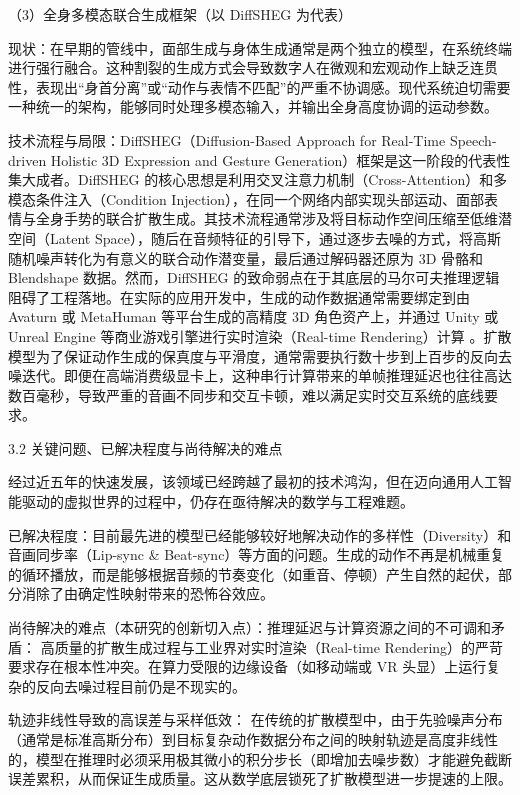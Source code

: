\documentclass[UTF8]{ctexart}
\begin{document}
（3）全身多模态联合生成框架（以 DiffSHEG 为代表）

现状：在早期的管线中，面部生成与身体生成通常是两个独立的模型，在系统终端进行强行融合。这种割裂的生成方式会导致数字人在微观和宏观动作上缺乏连贯性，表现出``身首分离''或``动作与表情不匹配''的严重不协调感。现代系统迫切需要一种统一的架构，能够同时处理多模态输入，并输出全身高度协调的运动参数。

技术流程与局限：DiffSHEG（Diffusion-Based Approach for Real-Time
Speech-driven Holistic 3D Expression and Gesture
Generation）框架是这一阶段的代表性集大成者。DiffSHEG
的核心思想是利用交叉注意力机制（Cross-Attention）和多模态条件注入（Condition
Injection），在同一个网络内部实现头部运动、面部表情与全身手势的联合扩散生成。其技术流程通常涉及将目标动作空间压缩至低维潜空间（Latent
Space），随后在音频特征的引导下，通过逐步去噪的方式，将高斯随机噪声转化为有意义的联合动作潜变量，最后通过解码器还原为
3D 骨骼和 Blendshape 数据。然而，DiffSHEG
的致命弱点在于其底层的马尔可夫推理逻辑阻碍了工程落地。在实际的应用开发中，生成的动作数据通常需要绑定到由
Avaturn 或 MetaHuman 等平台生成的高精度 3D 角色资产上，并通过 Unity 或
Unreal Engine 等商业游戏引擎进行实时渲染（Real-time Rendering）计算
。扩散模型为了保证动作生成的保真度与平滑度，通常需要执行数十步到上百步的反向去噪迭代。即便在高端消费级显卡上，这种串行计算带来的单帧推理延迟也往往高达数百毫秒，导致严重的音画不同步和交互卡顿，难以满足实时交互系统的底线要求。

3.2 关键问题、已解决程度与尚待解决的难点

经过近五年的快速发展，该领域已经跨越了最初的技术鸿沟，但在迈向通用人工智能驱动的虚拟世界的过程中，仍存在亟待解决的数学与工程难题。

已解决程度：目前最先进的模型已经能够较好地解决动作的多样性（Diversity）和音画同步率（Lip-sync \& Beat-sync）等方面的问题。生成的动作不再是机械重复的循环播放，而是能够根据音频的节奏变化（如重音、停顿）产生自然的起伏，部分消除了由确定性映射带来的恐怖谷效应。

尚待解决的难点（本研究的创新切入点）：推理延迟与计算资源之间的不可调和矛盾：
高质量的扩散生成过程与工业界对实时渲染（Real-time
Rendering）的严苛要求存在根本性冲突。在算力受限的边缘设备（如移动端或 VR
头显）上运行复杂的反向去噪过程目前仍是不现实的。

轨迹非线性导致的高误差与采样低效：
在传统的扩散模型中，由于先验噪声分布（通常是标准高斯分布）到目标复杂动作数据分布之间的映射轨迹是高度非线性的，模型在推理时必须采用极其微小的积分步长（即增加去噪步数）才能避免截断误差累积，从而保证生成质量。这从数学底层锁死了扩散模型进一步提速的上限。
\end{document}
